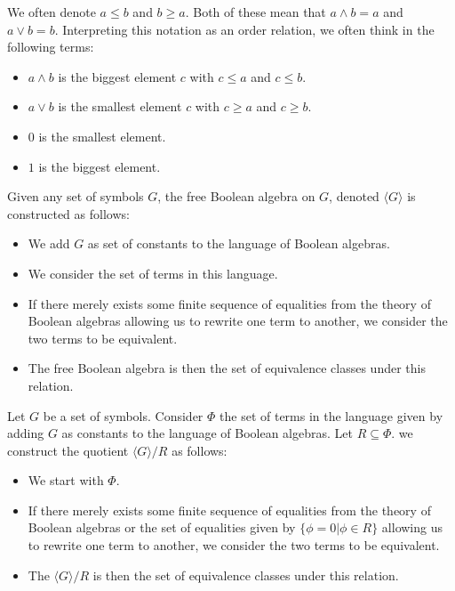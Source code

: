 \documentclass{../util/zariski-small}
\begin{document}
\begin{remark}
We often denote $a \leq b$ and  $b \geq a$. Both of these mean that $a\wedge b = a$ and $ a\vee b = b$. 
Interpreting this notation as an order relation, we often think in the following terms:
\begin{itemize}
  \item $a\wedge b$ is the biggest element $c$ with $c \leq a$ and $c\leq b$.
  \item $a\vee b$ is the smallest element $c$ with $c \geq a$ and $c \geq b$. 
  \item $0$ is the smallest element. 
  \item $1$ is the biggest element. 
\end{itemize}
\end{remark}
\begin{definition}
  Given any set of symbols $G$, the free Boolean algebra on $G$, denoted $\langle G \rangle$
  is constructed as follows:
  \begin{itemize}
    \item We add $G$ as set of constants to the language of Boolean algebras. 
    \item We consider the set of terms in this language. 
    \item If there merely exists some finite sequence of 
      equalities from the theory of Boolean algebras allowing us to rewrite one term to another, 
      we consider the two terms to be equivalent. 
    \item The free Boolean algebra is then the set of equivalence classes under this relation. 
  \end{itemize}
\end{definition}
\begin{definition}
  Let $G$ be a set of symbols. Consider $\Phi$ the set of terms in the language 
  given by adding $G$ as constants to the language of Boolean algebras. 
  Let $R \subseteq \Phi$. 
  we construct the quotient $\langle G \rangle / R$ as follows:
  \begin{itemize}
    \item We start with $\Phi$. 
    \item If there merely exists some finite sequence of 
      equalities from the theory of Boolean algebras or the set of equalities given by $\{\phi = 0 | \phi \in R\}$ 
      allowing us to rewrite one term to another, we consider the two terms to be equivalent. 
    \item The $\langle G \rangle / R$ is then the set of equivalence classes under this relation. 
  \end{itemize}
\end{definition}
\end{document}
